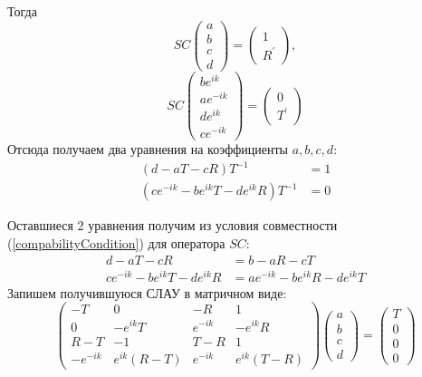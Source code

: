 \documentclass[a4 paper, 12 pt]{extarticle}
\begin{document}
   Тогда
   \begin{equation}
   \label{boundaryCond1}
   SC\left(
   \begin{array}{c}
   a \\
   b \\
   c \\
   d
   \end{array}\right) = \left(\begin{array}{c}
   1 \\
   R^\prime
   \end{array}\right),
   \end{equation}
   \begin{equation}
   \label{boundaryCond2}
   SC\left(
   \begin{array}{c}
   b e^{ik} \\
   a e^{-ik}\\
   d e^{ik}\\
   c e^{-ik}
   \end{array}\right) = \left(\begin{array}{c}
   0 \\
   T^\prime
   \end{array}\right)   
   \end{equation}
   Отсюда получаем два уравнения на коэффициенты $a, b, c, d$:
   \[
   \begin{aligned}
   \left(d - aT -cR\right)T^{-1} &= 1 \\
   \left(c e^{-ik} - b e^{ik} T - d e^{ik}R\right) T^{-1} &= 0
   \end{aligned}\]
   
   Оставшиеся 2 уравнения получим из условия совместности (\ref{compabilityCondition}) для оператора $SC$:
   \[
   \begin{aligned}
   d - aT -cR &= b - aR - cT \\
   c e^{-ik} - b e^{ik}T - d e^{ik} R &= a e^{-ik} - b e^{ik}R - d e^{ik} T
   \end{aligned}
   \]
   Запишем получившуюся СЛАУ в матричном виде:
   \[
   \begin{pmatrix}
   -T & 0 & -R & 1\\ 
   0 & -e^{ik}T  & e^{-ik} &-e^{ik}R \\ 
   R-T & -1 & T-R & 1\\ 
   -e^{-ik} & e^{ik}\left(R-T\right) & e^{-ik} & e^{ik}\left(T-R\right)
   \end{pmatrix}
   \begin{pmatrix}
   a \\
   b \\
   c \\
   d
   \end{pmatrix} = 
   \begin{pmatrix}
   T \\
   0 \\
   0 \\
   0 
   \end{pmatrix}\]
   
\end{document}
